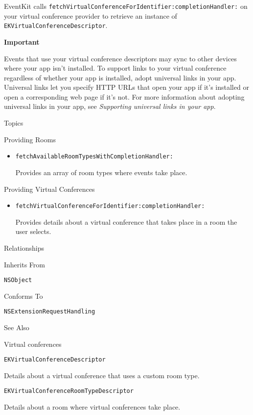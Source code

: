 \documentclass{article}
\begin{document}
EventKit calls \texttt{fetchVirtualConferenceForIdentifier:completionHandler:} on your virtual conference provider to retrieve an instance of \texttt{EKVirtualConferenceDescriptor}.

\textbf{Important}

Events that use your virtual conference descriptors may sync to other devices where your app isn't installed. To support links to your virtual conference regardless of whether your app is installed, adopt universal links in your app. Universal links let you specify HTTP URLs that open your app if it's installed or open a corresponding web page if it's not. For more information about adopting universal links in your app, see \textit{Supporting universal links in your app}.

Topics

Providing Rooms

\begin{itemize}
    \item \texttt{fetchAvailableRoomTypesWithCompletionHandler:}

    Provides an array of room types where events take place.
\end{itemize}

Providing Virtual Conferences

\begin{itemize}
    \item \texttt{fetchVirtualConferenceForIdentifier:completionHandler:}

    Provides details about a virtual conference that takes place in a room the user selects.
\end{itemize}

Relationships

Inherits From

\texttt{NSObject}

Conforms To

\texttt{NSExtensionRequestHandling}

See Also

Virtual conferences

\texttt{EKVirtualConferenceDescriptor}

Details about a virtual conference that uses a custom room type.

\texttt{EKVirtualConferenceRoomTypeDescriptor}

Details about a room where virtual conferences take place.

\newpage
\end{document}
